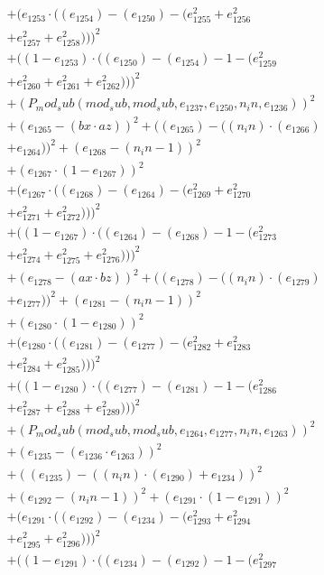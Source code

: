 \documentclass[10pt, a4paper]{article}
\begin{document}
\begin{small}
\begin{align*}
& + (e_{1253}  \cdot  ((e_{1254}) - (e_{1250}) - (e_{1255}^{2} + e_{1256}^{2} \\
& + e_{1257}^{2} + e_{1258}^{2})))^{2} \\
& + ((1 - e_{1253})  \cdot  ((e_{1250}) - (e_{1254}) - 1 - (e_{1259}^{2} \\
& + e_{1260}^{2} + e_{1261}^{2} + e_{1262}^{2})))^{2} \\
& + (P_mod_sub(mod_sub, mod_sub, e_{1237}, e_{1250}, n_in, e_{1236}))^{2} \\
& + (e_{1265} - (bx  \cdot  az))^{2} + ((e_{1265}) - ((n_in)  \cdot  (e_{1266}) \\
& + e_{1264}))^{2} + (e_{1268} - (n_in - 1))^{2} \\
& + (e_{1267}  \cdot  (1 - e_{1267}))^{2} \\
& + (e_{1267}  \cdot  ((e_{1268}) - (e_{1264}) - (e_{1269}^{2} + e_{1270}^{2} \\
& + e_{1271}^{2} + e_{1272}^{2})))^{2} \\
& + ((1 - e_{1267})  \cdot  ((e_{1264}) - (e_{1268}) - 1 - (e_{1273}^{2} \\
& + e_{1274}^{2} + e_{1275}^{2} + e_{1276}^{2})))^{2} \\
& + (e_{1278} - (ax  \cdot  bz))^{2} + ((e_{1278}) - ((n_in)  \cdot  (e_{1279}) \\
& + e_{1277}))^{2} + (e_{1281} - (n_in - 1))^{2} \\
& + (e_{1280}  \cdot  (1 - e_{1280}))^{2} \\
& + (e_{1280}  \cdot  ((e_{1281}) - (e_{1277}) - (e_{1282}^{2} + e_{1283}^{2} \\
& + e_{1284}^{2} + e_{1285}^{2})))^{2} \\
& + ((1 - e_{1280})  \cdot  ((e_{1277}) - (e_{1281}) - 1 - (e_{1286}^{2} \\
& + e_{1287}^{2} + e_{1288}^{2} + e_{1289}^{2})))^{2} \\
& + (P_mod_sub(mod_sub, mod_sub, e_{1264}, e_{1277}, n_in, e_{1263}))^{2} \\
& + (e_{1235} - (e_{1236}  \cdot  e_{1263}))^{2} \\
& + ((e_{1235}) - ((n_in)  \cdot  (e_{1290}) + e_{1234}))^{2} \\
& + (e_{1292} - (n_in - 1))^{2} + (e_{1291}  \cdot  (1 - e_{1291}))^{2} \\
& + (e_{1291}  \cdot  ((e_{1292}) - (e_{1234}) - (e_{1293}^{2} + e_{1294}^{2} \\
& + e_{1295}^{2} + e_{1296}^{2})))^{2} \\
& + ((1 - e_{1291})  \cdot  ((e_{1234}) - (e_{1292}) - 1 - (e_{1297}^{2} \\

\end{align*}
\end{small}
\end{document}
